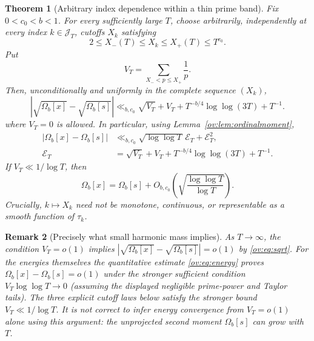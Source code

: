 \documentclass[11pt,reqno]{amsart}
\numberwithin{equation}{section}
\newtheorem{theorem}{Theorem}[section]
\newtheorem{remark}[theorem]{Remark}
\begin{document}
\begin{theorem}[Arbitrary index dependence within a thin prime band]\label{ov:thm:main}
Fix $0<c_0<b<1$. For every sufficiently large $T$, choose \emph{arbitrarily}, independently at every index $k\in\mathcal J_T$, cutoffs $X_k$ satisfying
\begin{equation}
2\le X_-(T)\le X_k\le X_+(T)\le T^{c_0}.
\label{ov:eq:band}
\end{equation}
Put
\begin{equation}
V_T=\sum_{X_-<p\le X_+}\frac1p.
\label{ov:eq:V}
\end{equation}
Then, unconditionally and uniformly in the complete sequence $(X_k)$,
\begin{equation}\label{ov:eq:sqrt}
\left|\sqrt{\Omega_b[x]}-\sqrt{\Omega_b[s]}\right|
\ll_{b,c_0}\sqrt{V_T}+V_T+T^{-b/4}\log\log(3T)+T^{-1}.
\end{equation}
where $V_T=0$ is allowed. In particular, using
Lemma~\ref{ov:lem:ordinalmoment},
\begin{align}
|\Omega_b[x]-\Omega_b[s]|
&\ll_{b,c_0}\sqrt{\log\log T}\,\mathcal E_T+\mathcal E_T^2,
\\
\mathcal E_T&=\sqrt{V_T}+V_T+T^{-b/4}\log\log(3T)+T^{-1}.
\label{ov:eq:energy}
\end{align}
If $V_T\ll1/\log T$, then
\begin{equation}
\boxed{\Omega_b[x]=\Omega_b[s]
 +O_{b,c_0}\left(\sqrt{\frac{\log\log T}{\log T}}\right).}
\label{ov:eq:claimed}
\end{equation}
Crucially, $k\mapsto X_k$ need not be monotone, continuous, or representable as a smooth function of $\tau_k$.
\end{theorem}

\begin{remark}[Precisely what small harmonic mass implies]
\label{ov:rem:massrate}
As $T\to\infty$, the condition $V_T=o(1)$ implies
$|\sqrt{\Omega_b[x]}-\sqrt{\Omega_b[s]}|=o(1)$ by
\eqref{ov:eq:sqrt}.  For the energies themselves the quantitative
estimate \eqref{ov:eq:energy} proves $\Omega_b[x]-\Omega_b[s]=o(1)$
under the stronger sufficient condition
$V_T\log\log T\to0$ (assuming the displayed negligible
prime-power and Taylor tails). The three explicit cutoff laws below
satisfy the stronger bound $V_T\ll1/\log T$.
It is not correct to infer energy convergence from $V_T=o(1)$
\emph{alone} using this argument: the unprojected second moment
$\Omega_b[s]$ can grow with $T$.
\end{remark}
\end{document}
